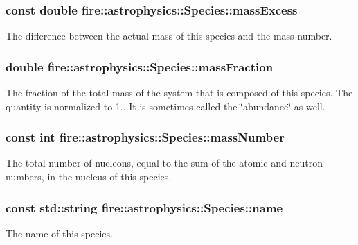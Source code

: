 \subsubsection[{\texorpdfstring{mass\+Excess}{massExcess}}]{\setlength{\rightskip}{0pt plus 5cm}const double fire\+::astrophysics\+::\+Species\+::mass\+Excess}\hypertarget{a00028_a3fd8c01bcbb27c20fb80cf9a9e6e1f66}{}\label{a00028_a3fd8c01bcbb27c20fb80cf9a9e6e1f66}
The difference between the actual mass of this species and the mass number. 
\subsubsection[{\texorpdfstring{mass\+Fraction}{massFraction}}]{\setlength{\rightskip}{0pt plus 5cm}double fire\+::astrophysics\+::\+Species\+::mass\+Fraction}\hypertarget{a00028_aa23c930af303e0c2b09491b18888855b}{}\label{a00028_aa23c930af303e0c2b09491b18888855b}
The fraction of the total mass of the system that is composed of this species. The quantity is normalized to 1.. It is sometimes called the \char`\"{}abundance\char`\"{} as well. 
\subsubsection[{\texorpdfstring{mass\+Number}{massNumber}}]{\setlength{\rightskip}{0pt plus 5cm}const int fire\+::astrophysics\+::\+Species\+::mass\+Number}\hypertarget{a00028_a403a85b9ffb625643b0bd5cf2e944376}{}\label{a00028_a403a85b9ffb625643b0bd5cf2e944376}
The total number of nucleons, equal to the sum of the atomic and neutron numbers, in the nucleus of this species. 
\subsubsection[{\texorpdfstring{name}{name}}]{\setlength{\rightskip}{0pt plus 5cm}const std\+::string fire\+::astrophysics\+::\+Species\+::name}\hypertarget{a00028_a4aea10c6b155eaeeb52dedcef2dcf849}{}\label{a00028_a4aea10c6b155eaeeb52dedcef2dcf849}
The name of this species. 
